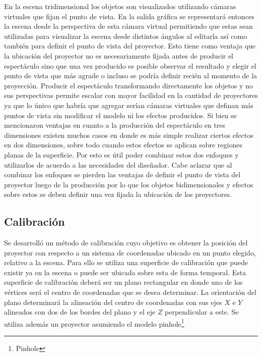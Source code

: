 En la escena tridimensional los objetos son visualizados utilizando cámaras virtuales que fijan el punto de vista. En la salida gráfica se representará entonces la escena desde la perspectiva de esta cámara virtual permitiendo que estas sean utilizadas para visualizar la escena desde distintos ángulos al editarla así como también para definir el punto de vista del proyector. Esto tiene como ventaja que la ubicación del proyector no es necesariamente fijada antes de producir el espectáculo sino que una vez producido es posible observar el resultado y elegir el punto de vista que más agrade o incluso se podría definir recién al momento de la proyección.
Producir el espectáculo transformando directamente los objetos y no sus perspectivas permite escalar con mayor facilidad en la cantidad de proyectores ya que lo único que habría que agregar serían cámaras virtuales que definan más puntos de vista sin modificar el modelo ni los efectos producidos.
Si bien se mencionaron ventajas en cuanto a la producción del espectáculo en tres dimensiones existen muchos casos en donde es más simple realizar ciertos efectos en dos dimensiones, sobre todo cuando estos efectos se aplican sobre regiones planas de la superficie. Por esto es útil poder combinar estos dos enfoques y utilizarlos de acuerdo a las necesidades del diseñador. Cabe aclarar que al combinar los enfoques se pierden las ventajas de definir el punto de vista del proyector luego de la producción por lo que los objetos bidimensionales y efectos sobre estos se deben definir una vez fijada la ubicación de los proyectores.

\subsection{Calibración}
Se desarrolló un método de calibración cuyo objetivo es obtener la posición del proyector con respecto a un sistema de coordenadas  ubicado en un punto elegido, relativo a la escena. Para ello se utiliza una superficie de calibración que puede existir ya en la escena o puede ser ubicada sobre esta de forma temporal. Esta superficie de calibración deberá ser un plano rectangular en donde uno de los vértices será el centro de coordenadas que se desea determinar. La orientación del plano determinará la alineación del centro de coordenadas con sus ejes $X$ e $Y$ alineados con dos de los bordes del plano y el eje $Z$ perpendicular a este.
Se utiliza además un proyector asumiendo el modelo pinhole\footnote{Pinhole}


